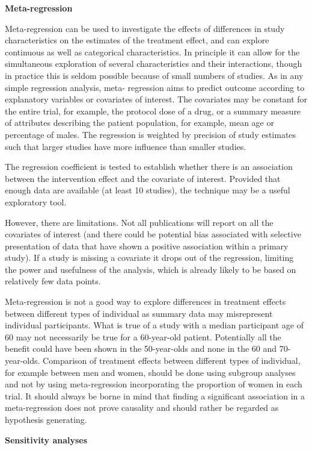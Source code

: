 \documentclass[
  11pt,
  a4paper,
  DIV=11,
  numbers=noendperiod]{scrreprt}
\begin{document}
\textbf{Meta-regression}

Meta-regression can be used to investigate the effects of differences in
study characteristics on the estimates of the treatment effect, and can
explore continuous as well as categorical characteristics. In principle
it can allow for the simultaneous exploration of several characteristics
and their interactions, though in practice this is seldom possible
because of small numbers of studies. As in any simple regression
analysis, meta- regression aims to predict outcome according to
explanatory variables or covariates of interest. The covariates may be
constant for the entire trial, for example, the protocol dose of a drug,
or a summary measure of attributes describing the patient population,
for example, mean age or percentage of males. The regression is weighted
by precision of study estimates such that larger studies have more
influence than smaller studies.

The regression coefficient is tested to establish whether there is an
association between the intervention effect and the covariate of
interest. Provided that enough data are available (at least 10 studies),
the technique may be a useful exploratory tool.

However, there are limitations. Not all publications will report on all
the covariates of interest (and there could be potential bias associated
with selective presentation of data that have shown a positive
association within a primary study). If a study is missing a covariate
it drops out of the regression, limiting the power and usefulness of the
analysis, which is already likely to be based on relatively few data
points.

Meta-regression is not a good way to explore differences in treatment
effects between different types of individual as summary data may
misrepresent individual participants. What is true of a study with a
median participant age of 60 may not necessarily be true for a
60-year-old patient. Potentially all the benefit could have been shown
in the 50-year-olds and none in the 60 and 70-year-olds. Comparison of
treatment effects between different types of individual, for example
between men and women, should be done using subgroup analyses and not by
using meta-regression incorporating the proportion of women in each
trial. It should always be borne in mind that finding a significant
association in a meta-regression does not prove causality and should
rather be regarded as hypothesis generating.

\textbf{Sensitivity analyses}
\end{document}
